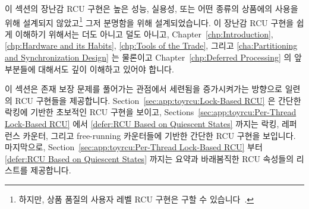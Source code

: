

이 섹션의 장난감 RCU 구현은 높은 성능, 실용성, 또는 어떤 종류의 상품에의 사용을
위해 설계되지 않았고\footnote{
	하지만, 상품 품질의 사용자 레벨 RCU 구현은 구할 수
	있습니다~\cite{MathieuDesnoyers2009URCU}.}
그저 분명함을 위해 설계되었습니다.
이 장난감 RCU 구현을 쉽게 이해하기 위해서는 더도 아니고 덜도 아니고,
Chapter~\ref{chp:Introduction},
\ref{chp:Hardware and its Habits},
\ref{chp:Tools of the Trade}, 그리고
\ref{cha:Partitioning and Synchronization Design}
는 물론이고
Chapter~\ref{chp:Deferred Processing} 의 앞부분들에 대해서도 깊이 이해하고
있어야 합니다.
\iffalse

The toy RCU implementations in this section are designed not for
high performance, practicality, or any kind of production use,\footnote{
	However, production-quality user-level RCU implementations
	are available~\cite{MathieuDesnoyers2009URCU,MathieuDesnoyers2012URCU}.}
but rather for clarity.
Nevertheless, you will need a thorough understanding of
Chapters~\ref{chp:Introduction},
\ref{chp:Hardware and its Habits},
\ref{chp:Tools of the Trade}, and
\ref{cha:Partitioning and Synchronization Design},
as well as the previous portions of
Chapter~\ref{chp:Deferred Processing}
for even these toy RCU implementations to be easily understandable.
\fi

이 섹션은 존재 보장 문제를 풀어가는 관점에서 세련됨을 증가시켜가는 방향으로
일련의 RCU 구현들을 제공합니다.
Section~\ref{sec:app:toyrcu:Lock-Based RCU} 은 간단한 락킹에 기반한 초보적인 RCU 구현을
보이고,
Sections~\ref{sec:app:toyrcu:Per-Thread Lock-Based RCU} 에서
\ref{defer:RCU Based on Quiescent States}
까지는 락킹, 레퍼런스 카운터, 그리고 free-running 카운터들에 기반한 간단한 RCU
구현을 보입니다.
마지막으로,
Section~\ref{sec:app:toyrcu:Per-Thread Lock-Based RCU} 부터
\ref{defer:RCU Based on Quiescent States} 까지는
요약과 바래봄직한 RCU 속성들의 리스트를 제공합니다.
\iffalse

This section provides a series of RCU implementations in order of
increasing sophistication, from the viewpoint of solving the
existence-guarantee problem.
Section~\ref{sec:app:toyrcu:Lock-Based RCU} presents a rudimentary
RCU implementation based on simple locking, while
Sections~\ref{sec:app:toyrcu:Per-Thread Lock-Based RCU} through
\ref{sec:app:toyrcu:RCU Based on Quiescent States}
present a series of
simple RCU implementations based on locking, reference counters,
and free-running counters.
Finally, Section~\ref{sec:app:toyrcu:Summary of Toy RCU Implementations}
provides a summary and a list of desirable RCU properties.
\fi

